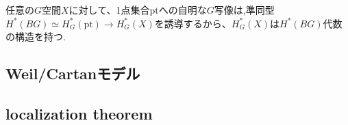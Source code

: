 任意の$G$空間$X$に対して、1点集合$\text{pt}$への自明な$G$写像は,準同型$H^*(BG)\simeq H^*_G(\text{pt})\rightarrow H^*_G(X)$を誘導するから、$H^*_G(X)$は$H^*(BG)$代数の構造を持つ.

\subsection{Weil/Cartanモデル}





\subsection{localization theorem}
